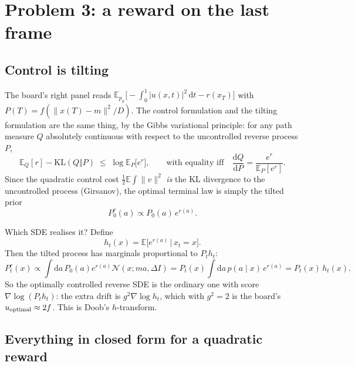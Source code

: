 \documentclass[11pt]{article}
\theoremstyle{plain}
\theoremstyle{remark}
\newcommand{\N}{\mathcal{N}}
\newcommand{\E}{\mathbb{E}}
\newcommand{\dd}{\mathrm{d}}
\begin{document}
\section{Problem 3: a reward on the last frame}\label{sec:p3}

\subsection{Control is tilting}

The board's right panel reads
$\E_{p_\mu}\bigl[-\int_0^1 |u(x,t)|^2\,\dd t - r(x_T)\bigr]$ with
$P(T) = f(\|x(T)-m\|^2/D)$. The control formulation and the tilting
formulation are the same thing, by the Gibbs variational principle: for any path
measure $Q$ absolutely continuous with respect to the uncontrolled reverse
process $P$,
\begin{equation}
  \E_Q[r] - \mathrm{KL}(Q \Vert P) \;\le\; \log \E_P\bigl[e^{r}\bigr],
  \qquad\text{with equality iff}\quad
  \frac{\dd Q}{\dd P} = \frac{e^{r}}{\E_P[e^r]}.
  \label{eq:gibbs}
\end{equation}
Since the quadratic control cost $\tfrac12\E\int\|v\|^2$ \emph{is} the KL
divergence to the uncontrolled process (Girsanov), the optimal terminal law is
simply the tilted prior
\begin{equation}
  P_0^r(a) \propto P_0(a)\, e^{r(a)} .
\end{equation}

Which SDE realises it? Define
\begin{equation}
  h_t(x) = \E\bigl[e^{r(a)} \,\big|\, x_t = x\bigr].
\end{equation}
Then the tilted process has marginals proportional to $P_t h_t$:
\begin{equation}
  P^r_t(x) \propto \int \dd a\, P_0(a)e^{r(a)}\N(x;ma,\Delta I)
  = P_t(x)\int \dd a\, p(a\mid x)\, e^{r(a)} = P_t(x)\, h_t(x).
  \label{eq:htransform}
\end{equation}
So the optimally controlled reverse SDE is the ordinary one with score
$\nabla\log(P_t h_t)$: the extra drift is $g^2\nabla \log h_t$, which with
$g^2 = 2$ is the board's $u_{\rm optimal} \approx 2f$. This is Doob's
$h$-transform.

\subsection{Everything in closed form for a quadratic reward}
\end{document}
